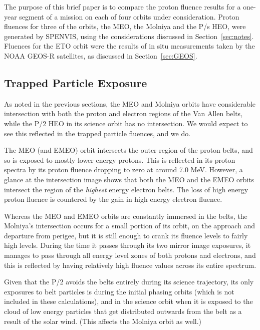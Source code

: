 \documentclass[11pt]{article}
\begin{document}
The purpose of this brief paper is to compare the proton fluence results for a one-year segment of a mission on each of four orbits under consideration. Proton fluences for three of the orbits, the MEO, the Molniya and the P/s HEO, were generated by SPENVIS, using the considerations discussed in Section~\ref{sec:notes}. Fluences for the ETO orbit were the results of in situ measurements taken by the NOAA GEOS-R satellites, as discussed in Section~\ref{sec:GEOS}.

\subsection{Trapped Particle Exposure}

As noted in the previous sections, the MEO and Molniya orbits have considerable intersection with both the proton and electron regions of the Van Allen belts, while the P/2 HEO in its science orbit has no intersection. We would expect to see this reflected in the trapped particle fluences, and we do. 

The MEO (and EMEO) orbit intersects the outer region of the proton belts, and so is exposed to mostly lower energy protons. This is reflected in its proton spectra by its proton fluence dropping to zero at around 7.0 MeV. However, a glance at the intersection image shows that both the MEO and the EMEO orbits intersect the region of the \textit{highest} energy electron belts. The loss of high energy proton fluence is countered by the gain in high energy electron fluence.

Whereas the MEO and EMEO orbits are constantly immersed in the belts, the Molniya's intersection occurs for a small portion of its orbit, on the approach and departure from perigee, but it is still enough to crank its fluence levels to fairly high levels. During the time it passes through its two mirror image exposures, it manages to pass through all energy level zones of both protons and electrons, and this is reflected by having relatively high fluence values across its entire spectrum.

Given that the P/2 avoids the belts entirely during its science trajectory, its only exposures to belt particles is during the initial phasing orbits (which is not included in these calculations), and in the science orbit when it is exposed to the cloud of low energy particles that get distributed outwards from the belt as a result of the solar wind. (This affects the Molniya orbit as well.)

\vspace{0.5cm}
\end{document}

